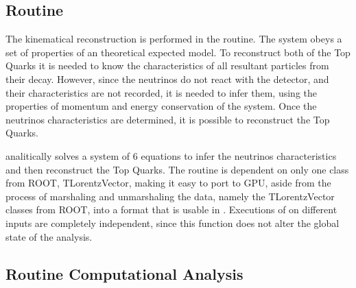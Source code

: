 \subsection{\dilep Routine}
\label{Application:dilep}

The kinematical reconstruction is performed in the \dilep routine. The \ttbar system obeys a set of properties of an theoretical expected model. To reconstruct both of the Top Quarks it is needed to know the characteristics of all resultant particles from their decay. However, since the neutrinos do not react with the detector, and their characteristics are not recorded, it is needed to infer them, using the properties of momentum and energy conservation of the system. Once the neutrinos characteristics are determined, it is possible to reconstruct the Top Quarks.

\dilep analitically solves a system of 6 equations to infer the neutrinos characteristics and then reconstruct the Top Quarks. The routine is dependent on only one class from ROOT, TLorentzVector, making it easy to port to GPU, aside from the process of marshaling and unmarshaling the data, namely the TLorentzVector classes from ROOT, into a format that is usable in \cuda. Executions of \dilep on different inputs are completely independent, since this function does not alter the global state of the \tth analysis.

\subsection{\ttDilepKinFit Routine Computational Analysis}
\label{Application:ttDilepKinFit:Analysis}

